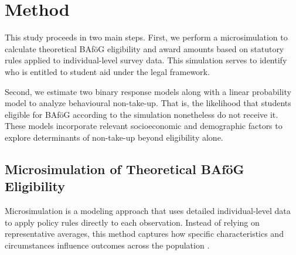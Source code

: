 %
%



\section{Method} 
This study proceeds in two main steps. 
First, we perform a microsimulation to calculate theoretical BAföG eligibility and award amounts based on statutory rules applied to individual-level survey data. 
This simulation serves to identify who is entitled to student aid under the legal framework. 


Second, we estimate two binary response models along with a linear probability model to analyze behavioural non-take-up.
That is, the likelihood that students eligible for BAföG according to the simulation nonetheless do not receive it. 
These models incorporate relevant socioeconomic and demographic factors to explore determinants of non-take-up beyond eligibility alone.

%
%
\subsection{Microsimulation of Theoretical BAföG Eligibility}

Microsimulation is a modeling approach that uses detailed individual-level data to apply policy rules directly to each observation. Instead of relying on representative averages, this method captures how specific characteristics and circumstances influence outcomes across the population \citep{klevmarken_microsimulation_2022}.

